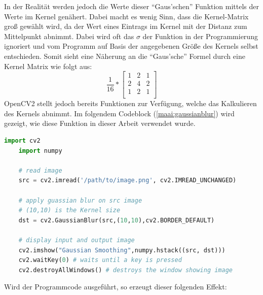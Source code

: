 In der Realität werden jedoch die Werte dieser ``Gaus'schen'' Funktion mittels der Werte im Kernel genähert. Dabei macht es wenig Sinn, dass die Kernel-Matrix groß gewählt wird, da der Wert eines Eintrags im Kernel mit der Distanz zum Mittelpunkt abnimmt. Dabei wird oft das \(\sigma\) der Funktion in der Programmierung ignoriert und vom Programm auf Basis der angegebenen Größe des Kernels selbst entschieden. Somit sieht eine Näherung an die ``Gaus'sche'' Formel durch eine Kernel Matrix wie folgt aus:
\[
    \frac{ 1 }{ 16 } * \left[\begin{array}{rrr}
            1 & 2 & 1 \\
            2 & 4 & 2 \\
            1 & 2 & 1 \\
        \end{array}\right]
\]
OpenCV2 stellt jedoch bereits Funktionen zur Verfügung, welche das Kalkulieren des Kernels abnimmt. Im folgendem Codeblock (\ref{maai:gaussianblur}) wird gezeigt, wie diese Funktion in dieser Arbeit verwendet wurde.


\begin{lstlisting}[caption=Gaussian Blur,language=Python,label=maai:gaussianblur]
    import cv2
    import numpy
    
    # read image
    src = cv2.imread('/path/to/image.png', cv2.IMREAD_UNCHANGED)
    
    # apply guassian blur on src image
    # (10,10) is the Kernel size
    dst = cv2.GaussianBlur(src,(10,10),cv2.BORDER_DEFAULT)
    
    # display input and output image
    cv2.imshow("Gaussian Smoothing",numpy.hstack((src, dst)))
    cv2.waitKey(0) # waits until a key is pressed
    cv2.destroyAllWindows() # destroys the window showing image
\end{lstlisting}


Wird der Programmcode ausgeführt, so erzeugt dieser folgenden Effekt:

